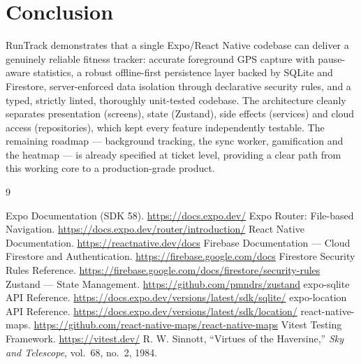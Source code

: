 \documentclass[11pt,a4paper]{report}
\begin{document}
\chapter{Conclusion}
RunTrack demonstrates that a single Expo/React Native codebase can deliver a genuinely reliable fitness tracker: accurate foreground GPS capture with pause-aware statistics, a robust offline-first persistence layer backed by SQLite and Firestore, server-enforced data isolation through declarative security rules, and a typed, strictly linted, thoroughly unit-tested codebase. The architecture cleanly separates presentation (screens), state (Zustand), side effects (services) and cloud access (repositories), which kept every feature independently testable. The remaining roadmap --- background tracking, the sync worker, gamification and the heatmap --- is already specified at ticket level, providing a clear path from this working core to a production-grade product.

\begin{thebibliography}{9}

 Expo Documentation (SDK 58). \url{https://docs.expo.dev/}
 Expo Router: File-based Navigation. \url{https://docs.expo.dev/router/introduction/}
 React Native Documentation. \url{https://reactnative.dev/docs}
 Firebase Documentation --- Cloud Firestore and Authentication. \url{https://firebase.google.com/docs}
 Firestore Security Rules Reference. \url{https://firebase.google.com/docs/firestore/security-rules}
 Zustand --- State Management. \url{https://github.com/pmndrs/zustand}
 expo-sqlite API Reference. \url{https://docs.expo.dev/versions/latest/sdk/sqlite/}
 expo-location API Reference. \url{https://docs.expo.dev/versions/latest/sdk/location/}
 react-native-maps. \url{https://github.com/react-native-maps/react-native-maps}
 Vitest Testing Framework. \url{https://vitest.dev/}
 R. W. Sinnott, ``Virtues of the Haversine,'' \textit{Sky and Telescope}, vol.~68, no.~2, 1984.

\end{thebibliography}
\end{document}
